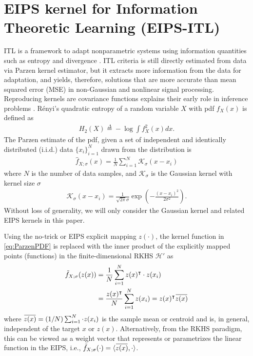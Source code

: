 \documentclass[8pt,twocolumn]{IEEEtran}
\newcommand{\overbar}[1]{\mkern 1.5mu\overline{\mkern-1.5mu#1\mkern-1.5mu}\mkern 1.5mu}
\begin{document}
\section{EIPS kernel for Information Theoretic Learning (EIPS-ITL)}\label{Sec:NTITL}
ITL is a framework to adapt nonparametric systems using information quantities such as entropy and divergence \cite{ITL}. ITL criteria is still directly estimated from data via Parzen kernel estimator, but it extracts more information from the data for adaptation, and yields, therefore, solutions that are more accurate than mean squared error (MSE) in non-Gaussian and nonlinear signal processing. Reproducing kernels are covariance functions explains their early role in inference problems \cite{Aronszajn1950,Parzen1959}. R\'{e}nyi's quadratic entropy of a random variable $X$ with pdf $f_X(x)$ is defined as
\begin{align}
H_2(X) \stackrel{\Delta}{=} -\log\int f^2_X(x)dx.
\end{align}
The Parzen estimate of the pdf, given a set of independent and identically distributed (i.i.d.) data $\{x_i\}^N_{i=1}$ drawn from the distribution is 
\begin{align}
\hat{f}_{X;\sigma}(x)=\frac{1}{N}\sum^{N}_{i=1}\mathcal{K}_\sigma(x-x_i)\label{eq:ParzenPDF}
\end{align}
where $N$ is the number of data samples, and $\mathcal{K}_\sigma$ is the Gaussian kernel with kernel size $\sigma$
\begin{align}
\mathcal{K}_\sigma(x-x_i)=\frac{1}{\sqrt{2\pi}\sigma}\exp\left(-\frac{(x-x_i)^2}{2\sigma^2}\right).
\end{align}
Without loss of generality, we will only consider the Gaussian kernel and related EIPS kernels in this paper.

Using the no-trick or EIPS explicit mapping $z(\cdot)$, the kernel function in \eqref{eq:ParzenPDF} is replaced with the inner product of the explicitly mapped points (functions) in the finite-dimensional RKHS $\mathcal{H}'$ as
 \begin{align}
 \tilde{f}_{X;\sigma}(z(x))&=\frac{1}{N}\sum^{N}_{i=1}z(x)^\intercal\cdot z(x_i)\nonumber\\
 &=\frac{z(x)^\intercal}{N}\sum^{N}_{i=1} z(x_i)=z(x)^\intercal\overbar{z(x)}
 \label{eq:NTParzenPDF}
 \end{align}
 where $\overbar{z(x)}=(1/N)\sum^{N}_{i=1}\cdot z(x_i)$ is the sample mean or centroid and is, in general, independent of the target $x$ or $z(x)$. Alternatively, from the RKHS paradigm, this can be viewed as a weight vector that represents or parametrizes the linear function in the EIPS, i.e.,  $\tilde{f}_{X;\sigma}(\cdot)=\langle \overbar{z(x)},\cdot\rangle$. 
\end{document}
